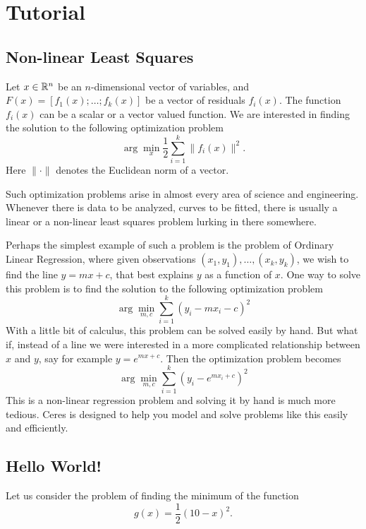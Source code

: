 \chapter{Tutorial}
\label{chapter:tutorial}

\section{Non-linear Least Squares}
\label{sec:tutorial:nonlinsq}
Let $x \in \mathbb{R}^n$ be an $n$-dimensional vector of variables, and
$F(x) = \left[f_1(x); \hdots ; f_k(x)\right]$ be a vector of residuals $f_i(x)$. 
The function $f_i(x)$ can be a scalar or a vector valued
function.   We are interested in finding the solution to the following optimization problem
\begin{equation}
	\arg \min_x \frac{1}{2} \sum_{i=1}^k \|f_i(x)\|^2.
\end{equation}
Here $\|\cdot\|$ denotes the Euclidean norm of a vector. 

Such optimization problems arise in almost every area of science and engineering. Whenever there is data to be analyzed, curves to be fitted, there is usually a linear or a non-linear least squares problem lurking in there somewhere. 

Perhaps the simplest example of such a problem is the problem of Ordinary Linear Regression, where given observations $(x_1,y_1),\hdots, (x_k,y_k)$, we wish to find the line $y = mx + c$, that best explains $y$ as a function of $x$. One way to solve this problem is to find the solution to the following optimization problem
\begin{equation}
		\arg\min_{m,c} \sum_{i=1}^k (y_i - m x_i - c)^2
\end{equation}
With a little bit of calculus, this problem can be solved easily by hand. But what if, instead of a line we were interested in a more complicated relationship between $x$ and $y$, say for example $y = e^{mx + c}$. Then the optimization problem becomes
\begin{equation}
		\arg\min_{m,c} \sum_{i=1}^k \left(y_i - e^{m x_i + c}\right)^2
\end{equation}
This is a  non-linear regression problem and solving it by hand is much more tedious.  Ceres is designed to help you model and solve problems like this easily and efficiently.

\section{Hello World!}
\label{sec:tutorial:helloworld}
Let us consider the problem of finding the minimum of the function
\begin{equation}
	g(x) = \frac{1}{2}(10 -x)^2.
\end{equation}

